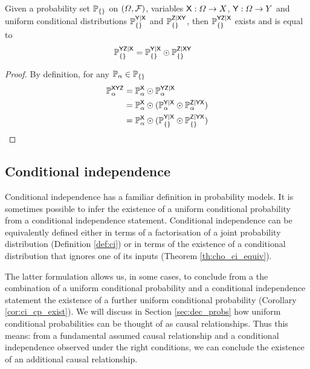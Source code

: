 \begin{theorem}\label{lem:joint_conditional}
Given a probability set $\mathbb{P}_{\{\}}$ on $(\Omega,\mathcal{F})$, variables $\mathsf{X}:\Omega\to X$, $\mathsf{Y}:\Omega\to Y$ and uniform conditional distributions $\mathbb{P}_{\{\}}^{\mathsf{Y}|\mathsf{X}}$ and $\mathbb{P}_{\{\}}^{\mathsf{Z}|\mathsf{XY}}$, then $\mathbb{P}_{\{\}}^{\mathsf{YZ}|\mathsf{X}}$ exists and is equal to
\begin{align}
	\mathbb{P}_{\{\}}^{\mathsf{YZ}|\mathsf{X}} &= \mathbb{P}_{\{\}}^{\mathsf{Y}|\mathsf{X}}\odot \mathbb{P}_{\{\}}^{\mathsf{Z}|\mathsf{XY}}
\end{align}
\end{theorem}

\begin{proof}
By definition, for any $\mathbb{P}_\alpha\in \mathbb{P}_{\{\}}$
\begin{align}
	\mathbb{P}_\alpha^{\mathsf{XYZ}} &= \mathbb{P}_\alpha^{\mathsf{X}}\odot \mathbb{P}_\alpha^{\mathsf{YZ}|\mathsf{X}}\\
							   &= \mathbb{P}_\alpha^{\mathsf{X}}\odot(\mathbb{P}_\alpha^{\mathsf{Y}|\mathsf{X}}\odot \mathbb{P}_\alpha^{\mathsf{Z}|\mathsf{YX}})\\
							   &= \mathbb{P}_\alpha^{\mathsf{X}}\odot(\mathbb{P}_{\{\}}^{\mathsf{Y}|\mathsf{X}}\odot \mathbb{P}_{\{\}}^{\mathsf{Z}|\mathsf{YX}})
\end{align}
\end{proof}

\subsection{Conditional independence}

Conditional independence has a familiar definition in probability models. It is sometimes possible to infer the existence of a uniform conditional probability from a conditional independence statement. Conditional independence can be equivalently defined either in terms of a factorisation of a joint probability distribution (Definition \ref{def:ci}) or in terms of the existence of a conditional distribution that ignores one of its inputs (Theorem \ref{th:cho_ci_equiv}). 

The latter formulation allows us, in some cases, to conclude from a the combination of a uniform conditional probability and a conditional independence statement the existence of a further uniform conditional probability (Corollary \ref{cor:ci_cp_exist}). We will discuss in Section \ref{sec:dec_probs} how uniform conditional probabilities can be thought of as causal relationships. Thus this means: from a fundamental assumed causal relationship and a conditional independence observed under the right conditions, we can conclude the existence of an additional causal relationship. 

